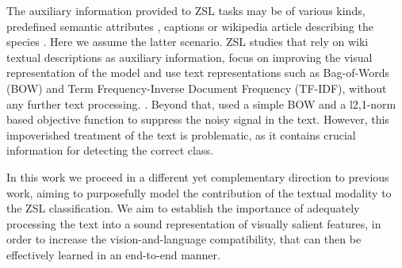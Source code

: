 \documentclass[11pt,a4paper]{article}
\begin{document}





The auxiliary information provided to ZSL tasks may be of various kinds, predefined semantic attributes \cite{lampert2009learning,changpinyo2020classifier,atzmon2018probabilistic}, captions \cite{Xian_2018_CVPR,Sariyildiz_2019_CVPR} or wikipedia article describing the species \cite{elhoseiny2017link}.
Here we assume the latter scenario. ZSL studies that rely on  wiki textual descriptions  as auxiliary information, focus on improving the visual representation of the model and use text representations such as Bag-of-Words (BOW) and Term Frequency-Inverse Document Frequency (TF-IDF), without any further text processing.  \cite{lei2015predicting,elhoseiny2013write,elhoseiny2016write,elhoseiny2017link,zhu2018generative}. Beyond that,  \citet{qiao2016less} used a simple BOW and a l2,1-norm based objective function to suppress the noisy signal in the text. However, this impoverished treatment of the text  is problematic, as it contains crucial information for detecting the correct class. 

In this work we proceed in  a different yet complementary direction to previous work, aiming to purposefully  model the contribution of the textual modality to the ZSL classification.
We aim to establish the importance of adequately processing the text into a sound representation of  visually salient features, in order to  increase the vision-and-language compatibility, that can then be effectively learned in an end-to-end manner.
\end{document}
